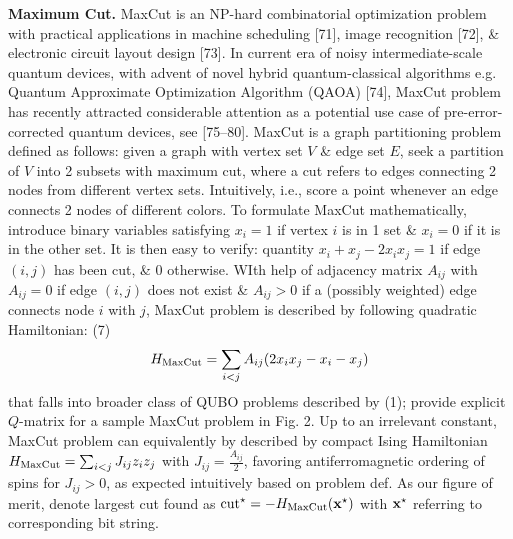 \documentclass{article}
\begin{document}
\begin{itemize}
    {\bf Maximum Cut.} MaxCut is an NP-hard combinatorial optimization problem with practical applications in machine scheduling [71], image recognition [72], \& electronic circuit layout design [73]. In current era of noisy intermediate-scale quantum devices, with advent of novel hybrid quantum-classical algorithms e.g. Quantum Approximate Optimization Algorithm (QAOA) [74], MaxCut problem has recently attracted considerable attention as a potential use case of pre-error-corrected quantum devices, see [75--80]. MaxCut is a graph partitioning problem defined as follows: given a graph with vertex set $V$ \& edge set $E$, seek a partition of $V$ into 2 subsets with maximum cut, where a cut refers to edges connecting 2 nodes from different vertex sets. Intuitively, i.e., score a point whenever an edge connects 2 nodes of different colors. To formulate MaxCut mathematically, introduce binary variables satisfying $x_i = 1$ if vertex $i$ is in 1 set \& $x_i = 0$ if it is in the other set. It is then easy to verify: quantity $x_i + x_j - 2x_ix_j = 1$ if edge $(i,j)$ has been cut, \& 0 otherwise. WIth help of adjacency matrix $A_{ij}$ with $A_{ij} = 0$ if edge $(i,j)$ does not exist \& $A_{ij} > 0$ if a (possibly weighted) edge connects node $i$ with $j$, MaxCut problem is described by following quadratic Hamiltonian: (7)
    \begin{equation*}
        H_{\rm MaxCut} = \sum_{i < j} A_{ij}(2x_ix_j - x_i - x_j)
    \end{equation*}
    that falls into broader class of QUBO problems described by (1); provide explicit $Q$-matrix for a sample MaxCut problem in {\sf Fig. 2}. Up to an irrelevant constant, MaxCut problem can equivalently by described by compact Ising Hamiltonian $H_{\rm MaxCut} = \sum_{i < j} J_{ij}z_iz_j$ with $J_{ij} = \frac{A_{ij}}{2}$, favoring antiferromagnetic ordering of spins for $J_{ij} > 0$, as expected intuitively based on problem def. As our figure of merit, denote largest cut found as ${\rm cut}^\star = -H_{\rm MaxCut}({\bf x}^\star)$ with ${\bf x}^\star$ referring to corresponding bit string.


\end{itemize}
\end{document}

